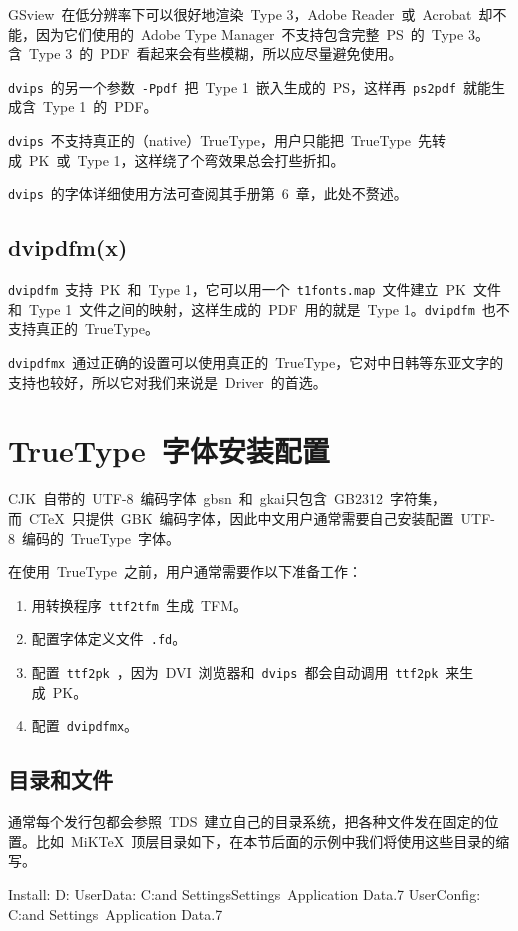GSview~在低分辨率下可以很好地渲染~Type 3，Adobe Reader~或~Acrobat~却不能，因为它们使用的~Adobe Type Manager~不支持包含完整~PS~的~Type 3。含~Type 3~的~PDF~看起来会有些模糊，所以应尽量避免使用。

\verb|dvips|~的另一个参数~\verb|-Ppdf|~把~Type 1~嵌入生成的~PS，这样再~\verb|ps2pdf|~就能生成含~Type 1~的~PDF。

\verb|dvips|~不支持真正的（native）TrueType，用户只能把~TrueType~先转成~PK~或~Type 1，这样绕了个弯效果总会打些折扣。

\verb|dvips|~的字体详细使用方法可查阅其手册\citep{Rokicki_2005}第~6~章，此处不赘述。

\subsection{dvipdfm(x)}
\verb|dvipdfm|~支持~PK~和~Type 1，它可以用一个~\verb|t1fonts.map|~文件建立~PK~文件和~Type 1~文件之间的映射，这样生成的~PDF~用的就是~Type 1。\verb|dvipdfm|~也不支持真正的~TrueType。

\verb|dvipdfmx|~通过正确的设置可以使用真正的~TrueType，它对中日韩等东亚文字的支持也较好，所以它对我们来说是~Driver~的首选。

\section{TrueType~字体安装配置}
CJK~自带的~UTF-8~编码字体~gbsn~和~gkai只包含~GB2312~字符集，而~CTeX~只提供~GBK~编码字体，因此中文用户通常需要自己安装配置~UTF-8~编码的~TrueType~字体。

在使用~TrueType~之前，用户通常需要作以下准备工作：
\begin{enumerate}
    \item 用转换程序~\verb|ttf2tfm|~生成~TFM。
    \item 配置字体定义文件~\verb|.fd|。
    \item 配置~\verb|ttf2pk|~，因为~DVI~浏览器和~\verb|dvips|~都会自动调用~\verb|ttf2pk|~来生成~PK。
    \item 配置~\verb|dvipdfmx|。
\end{enumerate}

\subsection{目录和文件}
通常每个发行包都会参照~TDS~建立自己的目录系统，把各种文件发在固定的位置。比如~MiKTeX~顶层目录如下，在本节后面的示例中我们将使用这些目录的缩写。
\begin{code}
Install: D:\edit{}
UserData: C:\Documents and Settings\Alpha\Local Settings\
    Application Data\MiKTeX\2.7
UserConfig: C:\Documents and Settings\Alpha\
    Application Data\MiKTeX\2.7
\end{code}

